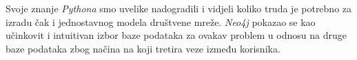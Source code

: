 \documentclass[titlepage, 12pt]{scrartcl}
\begin{document}
	Svoje znanje \emph{Pythona} smo uvelike nadogradili i vidjeli koliko truda je potrebno za izradu čak i jednostavnog modela društvene mreže. \emph{Neo4j} pokazao se kao učinkovit i intuitivan izbor baze podataka za ovakav problem u odnosu na druge baze podataka zbog načina na koji tretira veze između korisnika. 
	
	
	
\end{document}
